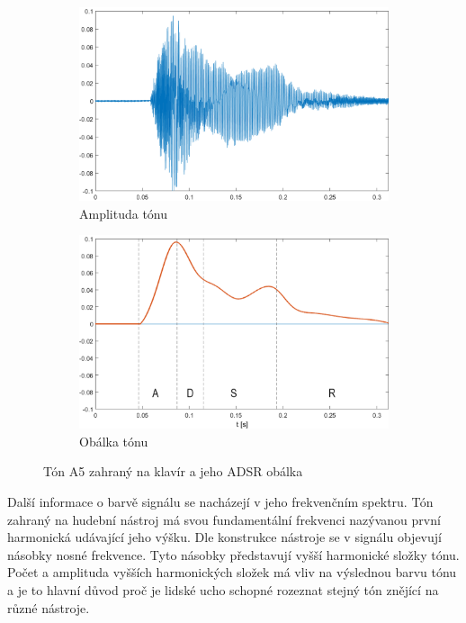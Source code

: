   \begin{figure}[H]
    \centering
    \begin{subfigure}[b]{0.8\linewidth}
        \includegraphics[width = \linewidth]{obrazky/Piano_tone_waveform.png}
        \caption{Amplituda tónu}
    \end{subfigure}
    \begin{subfigure}[b]{0.8\linewidth}
        \includegraphics[width = \linewidth]{obrazky/Piano_tone_obalka.png}
        \caption{Obálka tónu}
    \end{subfigure}
    \caption{Tón A5 zahraný na klavír a jeho ADSR obálka}
    \label{fig:ADSR_envelope_on_piano_tone}
  \end{figure}

  Další informace o barvě signálu se nacházejí v jeho frekvenčním spektru. 
  Tón zahraný na hudební nástroj má svou fundamentální  frekvenci nazývanou první harmonická udávající jeho výšku.
  Dle konstrukce nástroje se v signálu objevují násobky nosné frekvence.
  Tyto násobky představují vyšší harmonické složky tónu.
  Počet a amplituda vyšších harmonických složek má vliv na výslednou barvu tónu a je to hlavní důvod proč je lidské ucho schopné rozeznat stejný tón znějící na různé nástroje.

